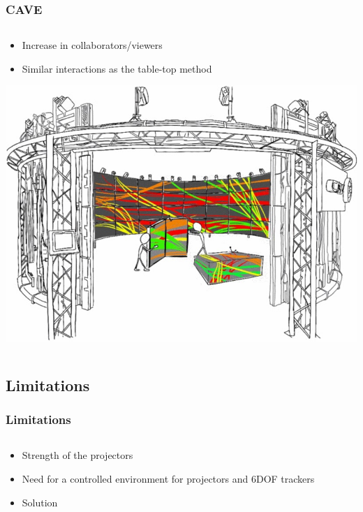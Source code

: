 \documentclass{beamer}
\begin{document}
\begin{frame}
\frametitle{CAVE}
\begin{columns}
    \begin{column}{0.7\textwidth}
    \begin{itemize}
		\item Increase in collaborators/viewers
		\item Similar interactions as the table-top method
	\end{itemize}
	\includegraphics[width=\textwidth]{../Sample_paper/images/CAVE}	
	\end{column}
    \end{columns}
\end{frame}

\subsection{Limitations}
\begin{frame}	
\frametitle{Limitations}
    \begin{columns}
    \begin{column}{.8\textwidth}
	\begin{itemize}
		\item Strength of the projectors 
		\item Need for a controlled environment for projectors and 6DOF trackers
		\item Solution
	\end{itemize}
	\end{column}
	\end{columns}
\end{frame}
\end{document}
